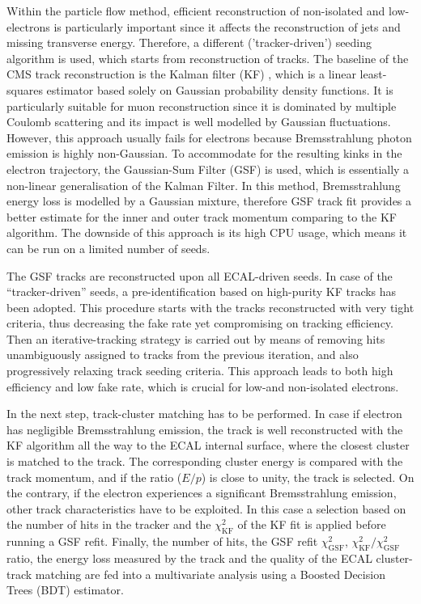Within the particle flow method, efficient reconstruction of non-isolated and low-\pt electrons is particularly
important since it affects the reconstruction of jets and missing transverse energy. Therefore, a different
('tracker-driven') seeding algorithm is used, which starts from reconstruction of tracks. The baseline of the CMS track
reconstruction is the Kalman filter (KF) \autocite{KF}, which is a linear least-squares estimator based solely on
Gaussian probability density functions. It is particularly suitable for muon reconstruction since it is dominated by
multiple Coulomb scattering and its impact is well modelled by Gaussian fluctuations. However, this approach usually
fails for electrons because Bremsstrahlung photon emission is highly non-Gaussian. To accommodate for the resulting
kinks in the electron trajectory, the Gaussian-Sum Filter (GSF) \autocite{GSF} is used, which is essentially a
non-linear generalisation of the Kalman Filter. In this method, Bremsstrahlung energy loss is modelled by a Gaussian
mixture, therefore GSF track fit provides a better estimate for the inner and outer track momentum comparing to the KF
algorithm. The downside of this approach is its high CPU usage, which means it can be run on a limited number of seeds.

The GSF tracks are reconstructed upon all ECAL-driven seeds. In case of the ``tracker-driven'' seeds, a
pre-identification based on high-purity KF tracks has been adopted. This procedure starts with the tracks reconstructed
with very tight criteria, thus decreasing the fake rate yet compromising on tracking efficiency. Then an
iterative-tracking strategy is carried out by means of removing hits unambiguously assigned to tracks from the previous
iteration, and also progressively relaxing track seeding criteria. This approach leads to both high efficiency and low
fake rate, which is crucial for low-\pt and non-isolated electrons.

In the next step, track-cluster matching has to be performed. In case if electron has negligible Bremsstrahlung
emission, the track is well reconstructed with the KF algorithm all the way to the ECAL internal surface, where the
closest cluster is matched to the track. The corresponding cluster energy is compared with the track momentum, and if
the ratio ($E/p$) is close to unity, the track is selected. On the contrary, if the electron experiences a significant
Bremsstrahlung emission, other track characteristics have to be exploited. In this case a selection based on the number
of hits in the tracker and the $\chi^2_\textrm{KF}$ of the KF fit is applied before running a GSF refit. Finally, the
number of hits, the GSF refit $\chi^2_\textrm{GSF}$, $\chi^2_\textrm{KF}/\chi^2_\textrm{GSF}$ ratio, the energy loss
measured by the track and the quality of the ECAL cluster-track matching are fed into a multivariate analysis using a
Boosted Decision Trees (BDT) estimator.

